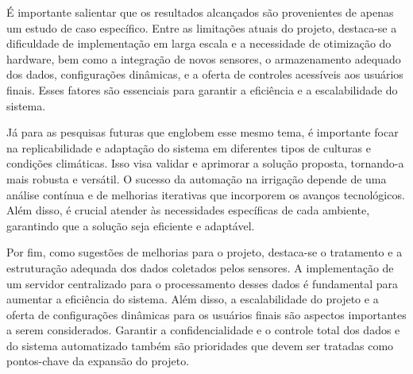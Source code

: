 \documentclass[%
  article,%
  a4paper,%
  12pt,%
  fleqn,%
  oneside,%
  chapter = TITLE,%
  section = TITLE,%
]{abntex2}
\begin{document}
É importante salientar que os resultados alcançados são provenientes de apenas um estudo de caso específico. Entre as limitações atuais do projeto, destaca-se a dificuldade de implementação em larga escala e a necessidade de otimização do hardware, bem  como a integração de novos sensores, o armazenamento adequado dos dados, configurações dinâmicas, e a oferta de controles acessíveis aos usuários finais. Esses fatores são essenciais para garantir a eficiência e a escalabilidade do sistema.

Já para as pesquisas futuras que englobem esse mesmo tema, é importante focar na replicabilidade e adaptação do sistema em diferentes tipos de culturas e condições climáticas. Isso visa validar e aprimorar a solução proposta, tornando-a mais robusta e versátil. O sucesso da automação na irrigação depende de uma análise contínua e de melhorias iterativas que incorporem os avanços tecnológicos. Além disso, é crucial atender às necessidades específicas de cada ambiente, garantindo que a solução seja eficiente e adaptável.

Por fim, como sugestões de melhorias para o projeto, destaca-se o tratamento e a estruturação adequada dos dados coletados pelos sensores. A implementação de um servidor centralizado para o processamento desses dados é fundamental para aumentar a eficiência do sistema. Além disso, a escalabilidade do projeto e a oferta de configurações dinâmicas para os usuários finais são aspectos importantes a serem considerados. Garantir a confidencialidade e o controle total dos dados e do sistema automatizado também são prioridades que devem ser tratadas como pontos-chave da expansão do projeto.


\postextual%
\newpage
\printbibliography%

\end{document}
